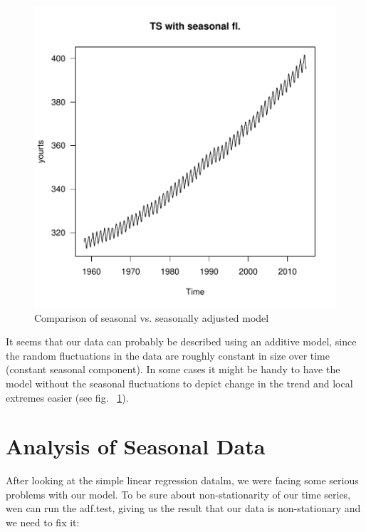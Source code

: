\documentclass[11pt, a4paper]{article} %
\begin{document}
\begin{figure}[H]
\centering
\begin{Schunk}
\end{Schunk}
\includegraphics{sweaveclean-seasonallyadjusted}
\caption{Comparison of seasonal vs. seasonally adjusted model}
\label{decomposition2}
\end{figure}


\noindent It seems that our data can probably be described using an additive model, since the random fluctuations in the data are roughly constant in size over time (constant seasonal component). In some cases it might be handy to have the model without the seasonal fluctuations to depict change in the trend and local extremes easier (see fig. ~\ref{decomposition2}).

\section{Analysis of Seasonal Data}


After looking at the simple linear regression datalm, we were facing some serious problems with our model. 
To be sure about non-stationarity of our time series,  wen can run the adf.test, giving us the result that our data is non-stationary and we need to fix it: 
\end{document}
